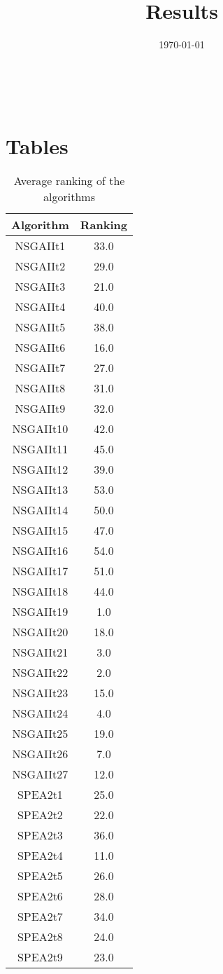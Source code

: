 \documentclass{article}
\title{Results}
\author{}
\date{\today}
\begin{document}
\oddsidemargin 0in \topmargin 0in\maketitle
\
\section{Tables}
\begin{table}[!htp]
\centering
\caption{Average ranking of the algorithms}
\begin{tabular}{c|c}
Algorithm&Ranking\\
\hline
NSGAIIt1&33.0\\
NSGAIIt2&29.0\\
NSGAIIt3&21.0\\
NSGAIIt4&40.0\\
NSGAIIt5&38.0\\
NSGAIIt6&16.0\\
NSGAIIt7&27.0\\
NSGAIIt8&31.0\\
NSGAIIt9&32.0\\
NSGAIIt10&42.0\\
NSGAIIt11&45.0\\
NSGAIIt12&39.0\\
NSGAIIt13&53.0\\
NSGAIIt14&50.0\\
NSGAIIt15&47.0\\
NSGAIIt16&54.0\\
NSGAIIt17&51.0\\
NSGAIIt18&44.0\\
NSGAIIt19&1.0\\
NSGAIIt20&18.0\\
NSGAIIt21&3.0\\
NSGAIIt22&2.0\\
NSGAIIt23&15.0\\
NSGAIIt24&4.0\\
NSGAIIt25&19.0\\
NSGAIIt26&7.0\\
NSGAIIt27&12.0\\
SPEA2t1&25.0\\
SPEA2t2&22.0\\
SPEA2t3&36.0\\
SPEA2t4&11.0\\
SPEA2t5&26.0\\
SPEA2t6&28.0\\
SPEA2t7&34.0\\
SPEA2t8&24.0\\
SPEA2t9&23.0\\

\end{tabular}
\end{table}
\end{document}
